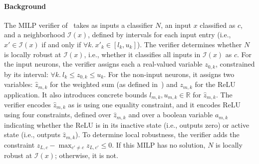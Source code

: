 \paragraph{Background}
The MILP verifier of~\citet{ref_42} takes as inputs a classifier $N$, an input $x$ classified as $c$, and a neighborhood $\mathcal{I}(x)$, defined by intervals for each input entry (i.e., $x' \in \mathcal{I}(x)$ if and only if $\forall k.\ x'_k \in [l_k, u_k]$). 
The verifier determines whether $N$ is locally robust at $\mathcal{I}(x)$, i.e., whether it classifies all inputs in $\mathcal{I}(x)$ as $c$. 
For the input neurons, 
the verifier assigns each a real-valued variable $z_{0,k}$, constrained by its interval: $\forall k.\ l_k \leq z_{0,k} \leq  u_k$. 
For the non-input neurons, it assigns two variables: $\hat{z}_{m,k}$ for the weighted sum (as defined in~) %
and ${z}_{m,k}$ for the ReLU application. It also introduces %
concrete bounds $l_{m,k}, u_{m,k}\in \mathbb{R}$ for $\hat{z}_{m,k}$.
The verifier encodes $\hat{z}_{m,k}$ as is using one equality constraint, and it encodes ReLU using four constraints, defined over $\hat{z}_{m,k}$ and over a boolean variable $a_{m,k}$ indicating whether the ReLU is in its inactive state (i.e., outputs zero) or active state (i.e., outputs $\hat{z}_{m,k}$).
To determine local robustness, the verifier adds the constraint %
$z_{L,c} - \max_{c'\neq c } z_{L,c'} \leq 0$. If this MILP has no solution, $N$ is locally robust at $\mathcal{I}(x)$; otherwise, it is not. %


